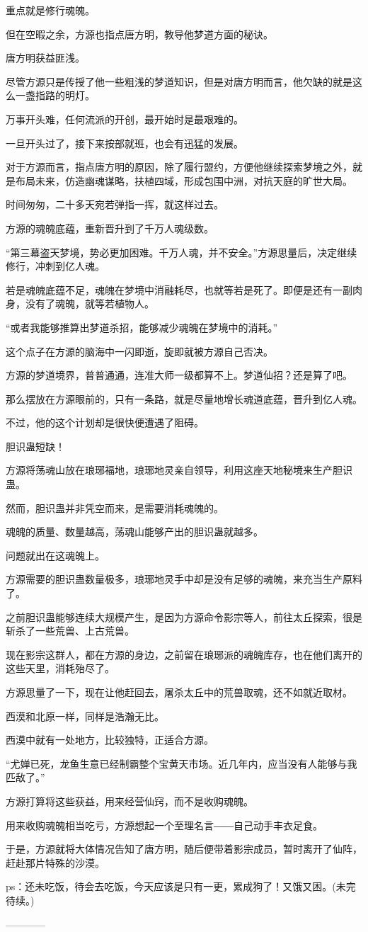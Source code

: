 \begin{this_body}
重点就是修行魂魄。

但在空暇之余，方源也指点唐方明，教导他梦道方面的秘诀。

唐方明获益匪浅。

尽管方源只是传授了他一些粗浅的梦道知识，但是对唐方明而言，他欠缺的就是这么一盏指路的明灯。

万事开头难，任何流派的开创，最开始时是最艰难的。

一旦开头过了，接下来按部就班，也会有迅猛的发展。

对于方源而言，指点唐方明的原因，除了履行盟约，方便他继续探索梦境之外，就是布局未来，仿造幽魂谋略，扶植四域，形成包围中洲，对抗天庭的旷世大局。

时间匆匆，二十多天宛若弹指一挥，就这样过去。

方源的魂魄底蕴，重新晋升到了千万人魂级数。

“第三幕盗天梦境，势必更加困难。千万人魂，并不安全。”方源思量后，决定继续修行，冲刺到亿人魂。

若是魂魄底蕴不足，魂魄在梦境中消融耗尽，也就等若是死了。即便是还有一副肉身，没有了魂魄，就等若植物人。

“或者我能够推算出梦道杀招，能够减少魂魄在梦境中的消耗。”

这个点子在方源的脑海中一闪即逝，旋即就被方源自己否决。

方源的梦道境界，普普通通，连准大师一级都算不上。梦道仙招？还是算了吧。

那么摆放在方源眼前的，只有一条路，就是尽量地增长魂道底蕴，晋升到亿人魂。

不过，他的这个计划却是很快便遭遇了阻碍。

胆识蛊短缺！

方源将荡魂山放在琅琊福地，琅琊地灵亲自领导，利用这座天地秘境来生产胆识蛊。

然而，胆识蛊并非凭空而来，是需要消耗魂魄的。

魂魄的质量、数量越高，荡魂山能够产出的胆识蛊就越多。

问题就出在这魂魄上。

方源需要的胆识蛊数量极多，琅琊地灵手中却是没有足够的魂魄，来充当生产原料了。

之前胆识蛊能够连续大规模产生，是因为方源命令影宗等人，前往太丘探索，很是斩杀了一些荒兽、上古荒兽。

现在影宗这群人，都在方源的身边，之前留在琅琊派的魂魄库存，也在他们离开的这些天里，消耗殆尽了。

方源思量了一下，现在让他赶回去，屠杀太丘中的荒兽取魂，还不如就近取材。

西漠和北原一样，同样是浩瀚无比。

西漠中就有一处地方，比较独特，正适合方源。

“尤婵已死，龙鱼生意已经制霸整个宝黄天市场。近几年内，应当没有人能够与我匹敌了。”

方源打算将这些获益，用来经营仙窍，而不是收购魂魄。

用来收购魂魄相当吃亏，方源想起一个至理名言――自己动手丰衣足食。

于是，方源就将大体情况告知了唐方明，随后便带着影宗成员，暂时离开了仙阵，赶赴那片特殊的沙漠。

ps：还未吃饭，待会去吃饭，今天应该是只有一更，累成狗了！又饿又困。(未完待续。)

------------

\end{this_body}

